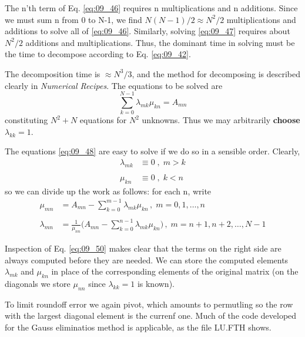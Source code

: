 The n'th term of Eq. \ref{eq:09_46} requires n multiplications and n additions.
Since we must sum n from 0 to N-1, we find $N(N-1)/2 \approx N^2/2$ multiplications and additions to solve all of \ref{eq:09_46}. Similarly, solving \ref{eq:09_47} requires about $N^2/2$ additions and multiplications. Thus, the dominant time in solving must be the time to decompose according to Eq. \ref{eq:09_42}.

The decomposition time is $\approx N^3/3$, and the method for decomposing is described clearly in \textit{Numerical Recipes}. The equations to be solved are
\begin{equation}
    \label{eq:09_48}
    \sum_{k=0}^{N-1}\lambda_{mk}\mu_{kn}=A_{mn}
\end{equation}
constituting $N^2 + N$ equations for $N^2$ unknowns. Thus we may arbitrarily \textbf{choose} $\lambda_{kk} = 1$.

The equations \ref{eq:09_48} are easy to solve if we do so in a sensible order.
Clearly,
\begin{align}
    \label{eq:09_49}
    \lambda_{mk} &\equiv 0\;,\; m > k  \nonumber \\
    &\\
    \mu_{kn} &\equiv 0\;,\; k < n  \nonumber
\end{align}
so we can divide up the work as follows: for each n, write
\begin{align}
    \label{eq:09_50}
    \mu_{mn} &= A_{mn} - \sum_{k=0}^{m-1}\lambda_{mk}\mu_{kn}\,,\;m=0,1,\dotsc,n  \nonumber \\
    & \\
    \lambda_{mn} &=\frac{1}{\mu_{nn}}\Big(A_{mn}-\sum_{k=0}^{n-1}\lambda_{mk}\mu_{kn}\Big)\,,\; m=n+1, n+2, \dotsc, N-1  \nonumber
\end{align}

Inspection of Eq. \ref{eq:09_50} makes clear that the terms on the right side are always computed before they are needed. We can store the computed elements $\lambda_{mk}$ and $\mu_{kn}$ in place of the corresponding elements of the original matrix (on the diagonals we store  $\mu_{nn}$ since $\lambda_{kk} = 1$ is known).

To limit roundoff error we again pivot, which amounts to permutling so the row with the largest diagonal element is the currenf one. Much of the code developed for the Gauss eliminatios method is applicable, as the file LU.FTH shows.